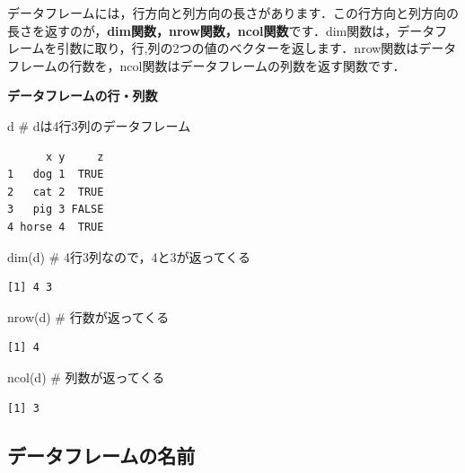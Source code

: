 \documentclass[
  letterpaper,
  DIV=11,
  numbers=noendperiod]{scrreprt}
\newenvironment{Shaded}{\begin{snugshade}}{\end{snugshade}}
\newcommand{\CommentTok}[1]{\textcolor[rgb]{0.37,0.37,0.37}{#1}}
\newcommand{\FunctionTok}[1]{\textcolor[rgb]{0.28,0.35,0.67}{#1}}
\newcommand{\NormalTok}[1]{\textcolor[rgb]{0.00,0.23,0.31}{#1}}
\begin{document}
データフレームには，行方向と列方向の長さがあります．この行方向と列方向の長さを返すのが，\textbf{dim関数，nrow関数，ncol関数}です．dim関数は，データフレームを引数に取り，行,列の2つの値のベクターを返します．nrow関数はデータフレームの行数を，ncol関数はデータフレームの列数を返す関数です．

\textbf{データフレームの行・列数}

\begin{Shaded}
\begin{Highlighting}[]
\NormalTok{d }\CommentTok{\# dは4行3列のデータフレーム}
\end{Highlighting}
\end{Shaded}

\begin{verbatim}
      x y     z
1   dog 1  TRUE
2   cat 2  TRUE
3   pig 3 FALSE
4 horse 4  TRUE
\end{verbatim}

\begin{Shaded}
\begin{Highlighting}[]
\FunctionTok{dim}\NormalTok{(d) }\CommentTok{\# 4行3列なので，4と3が返ってくる}
\end{Highlighting}
\end{Shaded}

\begin{verbatim}
[1] 4 3
\end{verbatim}

\begin{Shaded}
\begin{Highlighting}[]
\FunctionTok{nrow}\NormalTok{(d) }\CommentTok{\# 行数が返ってくる}
\end{Highlighting}
\end{Shaded}

\begin{verbatim}
[1] 4
\end{verbatim}

\begin{Shaded}
\begin{Highlighting}[]
\FunctionTok{ncol}\NormalTok{(d) }\CommentTok{\# 列数が返ってくる}
\end{Highlighting}
\end{Shaded}

\begin{verbatim}
[1] 3
\end{verbatim}

\hypertarget{ux30c7ux30fcux30bfux30d5ux30ecux30fcux30e0ux306eux540dux524d}{%
\subsection{データフレームの名前}\label{ux30c7ux30fcux30bfux30d5ux30ecux30fcux30e0ux306eux540dux524d}}
\end{document}
